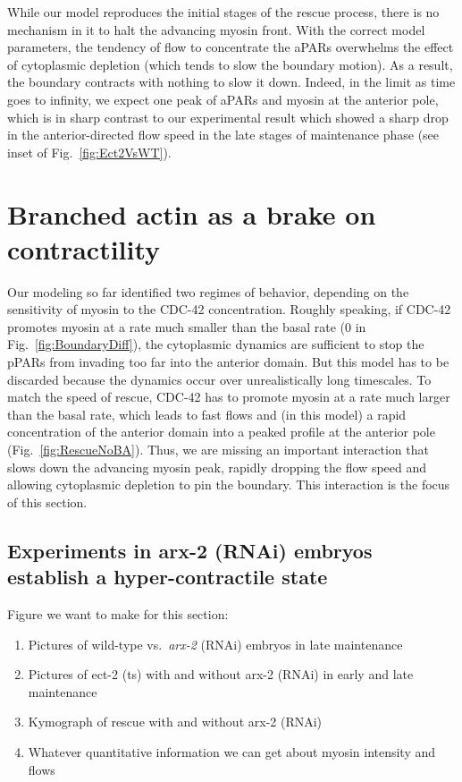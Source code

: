 \documentclass[11pt]{article}
\newcommand{\red}[1]{\color{red}#1\normalcolor}
\newcommand{\6}[1]{#1_{\text{6}}}
\newcommand{\3}[1]{#1_{\text{3}}}
\begin{document}
While our model reproduces the initial stages of the rescue process, there is no mechanism in it to halt the advancing myosin front. With the correct model parameters, the tendency of flow to concentrate the aPARs overwhelms the effect of cytoplasmic depletion (which tends to slow the boundary motion). As a result, the boundary contracts with nothing to slow it down. Indeed, in the limit as time goes to infinity, we expect one peak of aPARs and myosin at the anterior pole, which is in sharp contrast to our experimental result which showed a sharp drop in the anterior-directed flow speed in the late stages of maintenance phase (see inset of Fig.\ \ref{fig:Ect2VsWT}).

\newpage
\section{Branched actin as a brake on contractility }


Our modeling so far identified two regimes of behavior, depending on the sensitivity of myosin to the CDC-42 concentration. Roughly speaking, if CDC-42 promotes myosin at a rate much smaller than the basal rate (0 in Fig.\ \ref{fig:BoundaryDiff}), the cytoplasmic dynamics are sufficient to stop the pPARs from invading too far into the anterior domain. But this model has to be discarded because the dynamics occur over unrealistically long timescales. To match the speed of rescue, CDC-42 has to promote myosin at a rate much larger than the basal rate, which leads to fast flows and (in this model) a rapid concentration of the anterior domain into a peaked profile at the anterior pole (Fig.\ \ref{fig:RescueNoBA}). Thus, we are missing an important interaction that slows down the advancing myosin peak, rapidly dropping the flow speed and allowing cytoplasmic depletion to pin the boundary. This interaction is the focus of this section.

\subsection{Experiments in arx-2 (RNAi) embryos establish a hyper-contractile state}
\red{Figure we want to make for this section:
\begin{enumerate}[label=(\alph*),topsep=0pt,itemsep=-2ex]
\item Pictures of wild-type vs.\ \emph{arx-2} (RNAi) embryos in late maintenance
\item Pictures of ect-2 (ts) with and without arx-2 (RNAi) in early and late maintenance
\item Kymograph of rescue with and without arx-2 (RNAi) 
\item Whatever quantitative information we can get about myosin intensity and flows
\end{enumerate}
}
\end{document}
